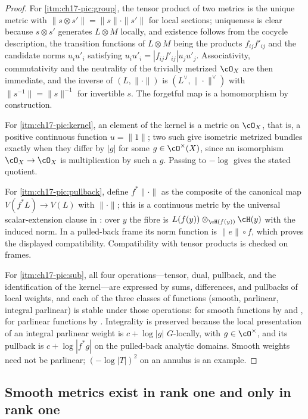 \begin{proof}
For \cref{itm:ch17-pic:group}, the tensor product of two metrics is the
unique metric with $\|s\otimes s'\|=\|s\|\cdot\|s'\|$ for local sections;
uniqueness is clear because $s\otimes s'$ generates $L\otimes M$ locally,
and existence follows from the cocycle description, the transition functions
of $L\otimes M$ being the products $f_{ij}f'_{ij}$ and the candidate
norms $u_iu'_i$ satisfying
$u_iu'_i=|f_{ij}f'_{ij}|u_ju'_j$.  Associativity, commutativity and the
neutrality of the trivially metrized $\cO_X$ are then immediate, and the
inverse of $(L,\|\cdot\|)$ is $(L^\vee,\|\cdot\|^\vee)$ with
$\|s^{-1}\|=\|s\|^{-1}$ for invertible $s$.  The forgetful map is a
homomorphism by construction.

For \cref{itm:ch17-pic:kernel}, an element of the kernel is a metric on
$\cO_X$, that is, a positive continuous function $u=\|1\|$; two such
give isometric metrized bundles exactly when they differ by $|g|$ for
some $g\in\cO^\times(X)$, since an isomorphism $\cO_X\to\cO_X$ is
multiplication by such a $g$.  Passing to $-\log$ gives the stated
quotient.

For \cref{itm:ch17-pic:pullback}, define $f^*\|\cdot\|$ as the composite of
the canonical map $V(f^*L)\to V(L)$ with $\|\cdot\|$; this is a
continuous metric by the universal scalar-extension clause in
: over $y$ the fibre is
$L(f(y))\otimes_{\cH(f(y))}\cH(y)$ with the induced norm.
In a pulled-back frame its norm function is $\|e\|\circ f$, which proves
the displayed compatibility.  Compatibility with tensor products is
checked on frames.

For \cref{itm:ch17-pic:sub}, all four operations---tensor, dual, pullback,
and the identification of the kernel---are expressed by sums, differences,
and pullbacks of local weights, and each of the three classes of functions
(smooth, parlinear, integral parlinear) is stable under those operations:
for smooth functions by  and
, for parlinear functions by
.  Integrality is preserved because the local
presentation of an integral parlinear weight is $c+\log|g|$
$G$-locally, with $g\in\cO^\times$, and its pullback is
$c+\log|f^*g|$ on the pulled-back analytic domains.  Smooth weights
need not be parlinear; $(-\log|T|)^2$ on an annulus is an example.
\end{proof}

\subsection{Smooth metrics exist in rank one and only in rank one}
\label{sec:ch17-smooth}

